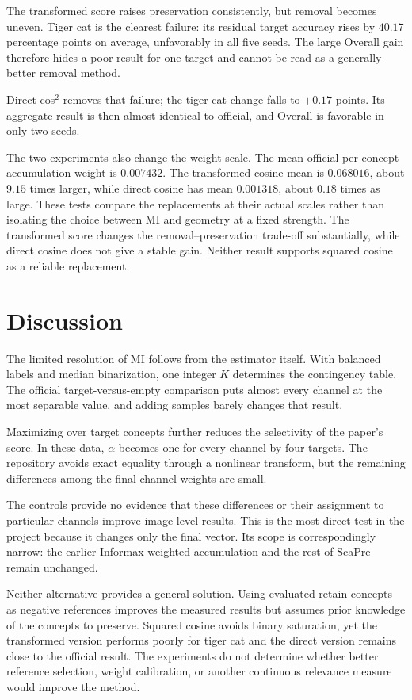 \documentclass[11pt]{article}
\begin{document}
The transformed score raises preservation consistently, but removal becomes uneven. Tiger cat is the clearest failure: its residual target accuracy rises by $40.17$ percentage points on average, unfavorably in all five seeds. The large Overall gain therefore hides a poor result for one target and cannot be read as a generally better removal method.

Direct cos$^2$ removes that failure; the tiger-cat change falls to $+0.17$ points. Its aggregate result is then almost identical to official, and Overall is favorable in only two seeds.

The two experiments also change the weight scale. The mean official per-concept accumulation weight is $0.007432$. The transformed cosine mean is $0.068016$, about $9.15$ times larger, while direct cosine has mean $0.001318$, about $0.18$ times as large. These tests compare the replacements at their actual scales rather than isolating the choice between MI and geometry at a fixed strength. The transformed score changes the removal--preservation trade-off substantially, while direct cosine does not give a stable gain. Neither result supports squared cosine as a reliable replacement.

\section{Discussion}
The limited resolution of MI follows from the estimator itself. With balanced labels and median binarization, one integer $K$ determines the contingency table. The official target-versus-empty comparison puts almost every channel at the most separable value, and adding samples barely changes that result.

Maximizing over target concepts further reduces the selectivity of the paper's score. In these data, $\alpha$ becomes one for every channel by four targets. The repository avoids exact equality through a nonlinear transform, but the remaining differences among the final channel weights are small.

The controls provide no evidence that these differences or their assignment to particular channels improve image-level results. This is the most direct test in the project because it changes only the final vector. Its scope is correspondingly narrow: the earlier Informax-weighted accumulation and the rest of ScaPre remain unchanged.

Neither alternative provides a general solution. Using evaluated retain concepts as negative references improves the measured results but assumes prior knowledge of the concepts to preserve. Squared cosine avoids binary saturation, yet the transformed version performs poorly for tiger cat and the direct version remains close to the official result. The experiments do not determine whether better reference selection, weight calibration, or another continuous relevance measure would improve the method.
\end{document}
